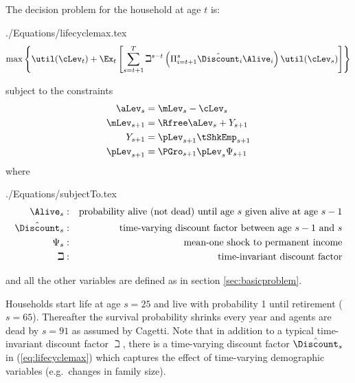 \documentclass[titlepage]{\econtex}
\begin{document}
  The decision problem for the household at age $t$ is:
  \begin{verbatimwrite}{./Equations/lifecyclemax.tex}
    \begin{equation}
      \max \left\{ \util(\cLev_{t})+\Ex_{t}\left[\sum_{s=t+1}^{T} {\beth}^{s-t}\left( \Pi _{i=t+1}^{s}\hat{\Discount}_{i} \Alive _{i}\right) \util(\cLev_{s}) \right]\right\}   \label{eq:lifecyclemax}
    \end{equation}
  \end{verbatimwrite}
  
  subject to the constraints
  \begin{equation*}\begin{gathered}\begin{aligned}
    \aLev_{s}  & = \mLev_{s}-\cLev_{s}
    \\      \mLev_{s+1}  & = \Rfree \aLev_{s}+Y_{s+1}
    \\      Y_{s+1}  & = \pLev_{s+1}\tShkEmp _{s+1}
    \\      \pLev_{s+1}  & = \PGro_{s+1}\pLev_{s}\Psi_{s+1}
  \end{aligned}\end{gathered}\end{equation*}
  where
  \begin{verbatimwrite}{./Equations/subjectTo.tex}
    \begin{equation*}\begin{gathered}\begin{aligned}
      \Alive _{s} &:&\text{probability alive (not dead) until age $s$ given alive at age $s-1$}
      \\      {\hat{\Discount}}_{s} &:&\text{time-varying discount factor between age $s-1$ and $s$}
      \\     \Psi_{s} &:&\text{mean-one shock to permanent income}
      \\     \beth &:&\text{time-invariant discount factor}
    \end{aligned}\end{gathered}\end{equation*}
  \end{verbatimwrite}
  
  and all the other variables are defined as in section \ref{sec:basicproblem}.

  Households start life at age $s=25$ and live with probability 1 until retirement
  ($s=65$). Thereafter the survival probability shrinks every year and
  agents are dead by $s=91$ as assumed by Cagetti. Note that in addition to a typical
  time-invariant discount factor $\beth$, there is a time-varying
  discount factor $\hat{\Discount}_{s}$ in (\ref{eq:lifecyclemax}) which
  captures the effect of time-varying demographic variables (e.g.\ changes in family size).
\end{document}
